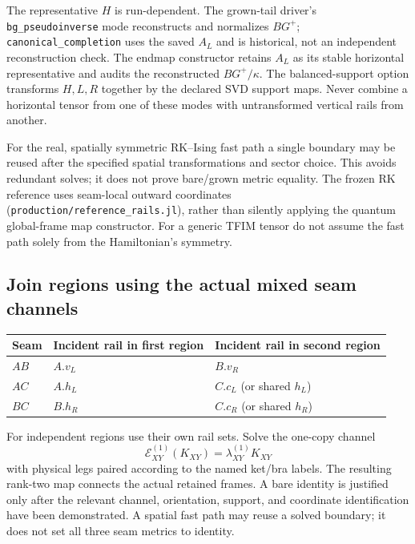 \documentclass[11pt]{article}
\newcommand{\code}[1]{{\small\nolinkurl{#1}}}
\begin{document}
The representative $H$ is run-dependent. The grown-tail driver's
\code{bg_pseudoinverse} mode reconstructs and normalizes $BG^+$;
\code{canonical_completion} uses the saved $A_L$ and is historical, not an
independent reconstruction check. The endmap constructor retains $A_L$ as its
stable horizontal representative and audits the reconstructed $BG^+/\kappa$.
The balanced-support option transforms $H,L,R$ together by the declared SVD
support maps. Never combine a horizontal tensor from one of these modes with
untransformed vertical rails from another.

For the real, spatially symmetric RK--Ising fast path a single boundary may
be reused after the specified spatial transformations and sector choice.
This avoids redundant solves; it does not prove bare/grown metric equality.
The frozen RK reference uses seam-local outward coordinates
(\code{production/reference_rails.jl}), rather than silently applying the
quantum global-frame map constructor. For a generic TFIM tensor do not assume
the fast path solely from the Hamiltonian's symmetry.
\subsection{Join regions using the actual mixed seam channels}
\fi

\begin{center}\small
\begin{tabular}{lll}\toprule
Seam & Incident rail in first region & Incident rail in second region\\\midrule
$AB$ & $A.v_L$ & $B.v_R$\\
$AC$ & $A.h_L$ & $C.c_L$ (or shared $h_L$)\\
$BC$ & $B.h_R$ & $C.c_R$ (or shared $h_R$)\\\bottomrule
\end{tabular}
\end{center}
For independent regions use their own rail sets. Solve the one-copy channel
\begin{equation}
 \mathcal E_{XY}^{(1)}(K_{XY})=\lambda_{XY}^{(1)}K_{XY}
\end{equation}
with physical legs paired according to the named ket/bra labels.
The resulting rank-two map connects the actual retained frames. A bare
identity is justified only after the relevant channel, orientation, support,
and coordinate identification have been demonstrated. A spatial fast path
may reuse a solved boundary; it does not set all three seam metrics to identity.
\end{document}
